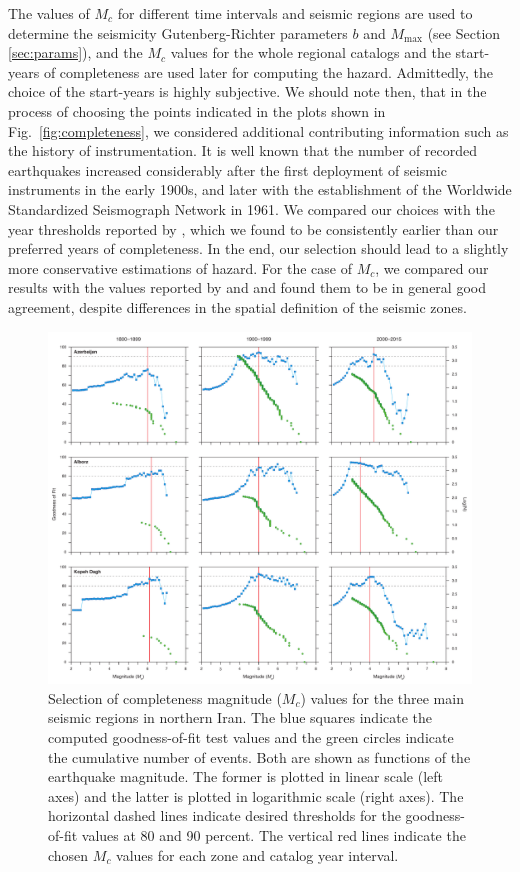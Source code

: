 The values of $M_c$ for different time intervals and seismic regions are used to determine the seismicity Gutenberg-Richter parameters $b$ and $M_{\max}$ (see Section \ref{sec:params}), and the $M_c$ values for the whole regional catalogs and the start-years of completeness are used later for computing the hazard. Admittedly, the choice of the start-years is highly subjective. We should note then, that in the process of choosing the points indicated in the plots shown in Fig.~\ref{fig:completeness}, we considered additional contributing information such as the history of instrumentation. It is well known that the number of recorded earthquakes increased considerably after the first deployment of seismic instruments in the early 1900s, and later with the establishment of the Worldwide Standardized Seismograph Network in 1961. We compared our choices with the year thresholds reported by \citet{Zare2014}, which we found to be consistently earlier than our preferred years of completeness. In the end, our selection should lead to a slightly more conservative estimations of hazard. For the case of $M_c$, we compared our results with the values reported by \citet{Karimiparidari2013} and \citet{Khodaverdian_2016_BSSA} and found them to be in general good agreement, despite differences in the spatial definition of the seismic zones.

\begin{figure}[t]
    \centering
    \includegraphics[width=\textwidth]{figures/pdf/figure-06.pdf} 
    \caption{Selection of completeness magnitude ($M_c$) values for the three main seismic regions in northern Iran. The blue squares indicate the computed goodness-of-fit test values and the green circles indicate the cumulative number of events. Both are shown as functions of the earthquake magnitude. The former is plotted in linear scale (left axes) and the latter is plotted in logarithmic scale (right axes). The horizontal dashed lines indicate desired thresholds for the goodness-of-fit values at 80 and 90 percent. The vertical red lines indicate the chosen $M_c$ values for each zone and catalog year interval.}
    \label{fig:mc}
\end{figure}

